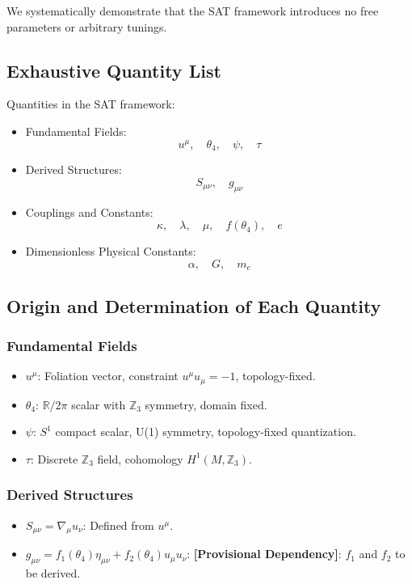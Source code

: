 \documentclass[12pt]{article}
\begin{document}
We systematically demonstrate that the SAT framework introduces no free parameters or arbitrary tunings.

\subsection{Exhaustive Quantity List}

Quantities in the SAT framework:
\begin{itemize}
    \item Fundamental Fields:
    \[
    u^\mu, \quad \theta_4, \quad \psi, \quad \tau
    \]
    \item Derived Structures:
    \[
    S_{\mu\nu}, \quad g_{\mu\nu}
    \]
    \item Couplings and Constants:
    \[
    \kappa, \quad \lambda, \quad \mu, \quad f(\theta_4), \quad e
    \]
    \item Dimensionless Physical Constants:
    \[
    \alpha, \quad G, \quad m_e
    \]
\end{itemize}

\subsection{Origin and Determination of Each Quantity}

\subsubsection{Fundamental Fields}

\begin{itemize}
    \item \( u^\mu \): Foliation vector, constraint \( u^\mu u_\mu = -1 \), topology-fixed.
    \item \( \theta_4 \): \( \mathbb{R}/2\pi \) scalar with \( \mathbb{Z}_3 \) symmetry, domain fixed.
    \item \( \psi \): \( S^1 \) compact scalar, U(1) symmetry, topology-fixed quantization.
    \item \( \tau \): Discrete \( \mathbb{Z}_3 \) field, cohomology \( H^1(M, \mathbb{Z}_3) \).
\end{itemize}

\subsubsection{Derived Structures}

\begin{itemize}
    \item \( S_{\mu\nu} = \nabla_\mu u_\nu \): Defined from \( u^\mu \).
    \item \( g_{\mu\nu} = f_1(\theta_4) \eta_{\mu\nu} + f_2(\theta_4) u_\mu u_\nu \):
    \textbf{[Provisional Dependency]}: \( f_1 \) and \( f_2 \) to be derived.
\end{itemize}
\end{document}
